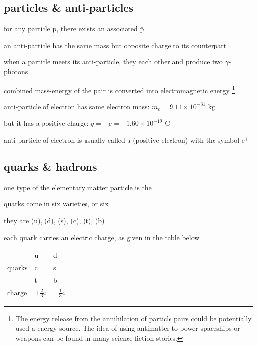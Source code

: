 \subsection{particles \& anti-particles}

for any particle $\text{p}$, there exists an associated  $\bar{\text{p}}$

\cmt an anti-particle has the same mass but opposite charge to its counterpart

\cmt when a particle meets its anti-particle, they  each other and produce two $\gamma$-photons

combined mass-energy of the pair is converted into electromagnetic energy
\footnote{The energy release from the annihilation of  particle pairs could be potentially used a energy source. The idea of using antimatter to power spaceships or weapons can be found in many science fiction stories.}




\begin{soln} anti-particle of electron has same electron mass: $m_e = 9.11\times10^{-31} \text{ kg}$

but it has a positive charge: $q = +e = + 1.60\times10^{-19} \text{ C}$

anti-particle of electron is usually called a  (positive electron) with the symbol $\text{e}^+$ \end{soln}


\subsection{quarks \& hadrons}

one type of the elementary matter particle is the 

\cmt quarks come in six varieties, or six 

they are  (u),  (d),  (s),  (c),  (t),  (b)

\cmt each quark carries an electric charge, as given in the table below

\begin{center}
	{\renewcommand{\arraystretch}{1.35}
		\begin{tabular}{|C{3cm}|C{2cm}|C{2cm}|}
			\hline  & u & d \\
			 quarks & c & s \\
			  & t & b \\
			\hline charge & $+\frac{2}{3}e$ & $-\frac{1}{3}e$ \\[3pt]
			\hline
		\end{tabular}
	}
\end{center}

